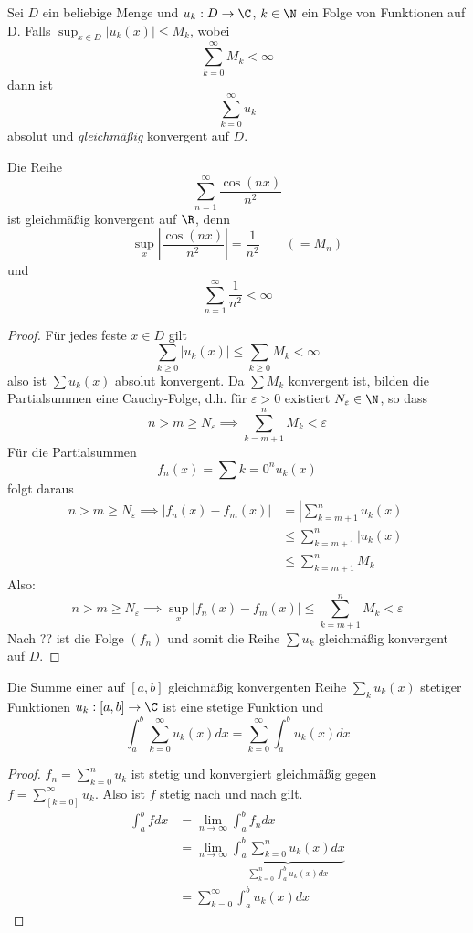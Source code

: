\documentclass{mycourse}
\begin{document}
\begin{thm}
Sei $D$ ein beliebige Menge und $u_k:D\to\C$, $k\in\N$ ein Folge von Funktionen auf D.
Falls $\sup_{x\in D}|u_k(x)|\le M_k$, wobei
\[
\sum_{k=0}^\infty M_k<\infty
\]
dann ist 
\[
\sum_{k=0}^\infty u_k
\]
absolut und \emph{gleichmäßig} konvergent auf $D$.
\begin{ex*}
Die Reihe
\[
\sum_{n=1}^\infty \frac{\cos(nx)}{n^2}
\]
ist gleichmäßig konvergent auf $\R$, denn
\[
\sup_x\left|\frac{\cos(nx)}{n^2}\right|=\frac 1{n^2}\qquad (=M_n)
\]
und
\[
\sum_{n=1}^\infty\frac 1{n^2}<\infty
\]
\end{ex*}
\begin{proof}
Für jedes feste $x \in D$ gilt
\[
\sum_{k\ge 0} |u_k(x)|\le \sum_{k\ge 0}M_k <\infty
\]
also ist $\sum u_k(x)$ absolut konvergent.
Da $\sum M_k$ konvergent ist, bilden die Partialsummen eine Cauchy-Folge, d.h. für $\varepsilon>0$ existiert $N_\varepsilon\in \N$, so dass
\[
n>m\ge N_\varepsilon \implies \sum_{k=m+1}^n M_k <\varepsilon
\]
Für die Partialsummen
\[
f_n(x)=\sum{k=0}^n u_k(x)
\]
folgt daraus
\begin{align*}
n>m\ge N_\varepsilon \implies |f_n(x)-f_m(x)| &= |\sum_{k=m+1}^n u_k(x)|\\
&\le \sum_{k=m+1}^n |u_k(x)|\\
&\le \sum_{k=m+1}^n M_k
\end{align*}
Also:
\[
n>m\ge N_\varepsilon \implies \sup_x|f_n(x)-f_m(x)| \le \sum_{k=m+1}^n M_k < \varepsilon
\]
Nach ?? ist die Folge $(f_n)$ und somit die Reihe $\sum u_k$ gleichmäßig konvergent auf $D$.
\end{proof}
\end{thm}

\begin{st}
Die Summe einer auf $[a,b]$ gleichmäßig konvergenten Reihe
$\sum_k u_k(x)$ stetiger Funktionen $u_k:[a,b]\to\C$ ist eine stetige Funktion und
\[
\int_a^b\sum_{k=0}^\infty u_k(x)dx = \sum_{k=0}^\infty\int_a^b u_k(x)dx
\]
\begin{proof}
$f_n =\sum_{k=0}^n u_k$ ist stetig und konvergiert gleichmäßig gegen $f=\sum_[k=0]^\infty u_k$.
Also ist $f$ stetig nach \fixme[thm??] und nach \fixme[thm??] gilt.
\begin{align*}
\int_a^b fdx
&=\lim_{n\to\infty}\int_a^b f_ndx\\
&=\lim_{n\to\infty} \underbrace{\int_a^b \sum_{k=0}^n u_k(x)dx}_{\sum_{k=0}^n\int_a^b u_k(x)dx}\\
&=\sum_{k=0}^\infty\int_a^b u_k(x)dx
\end{align*}
\end{proof}
\end{st}
\end{document}
